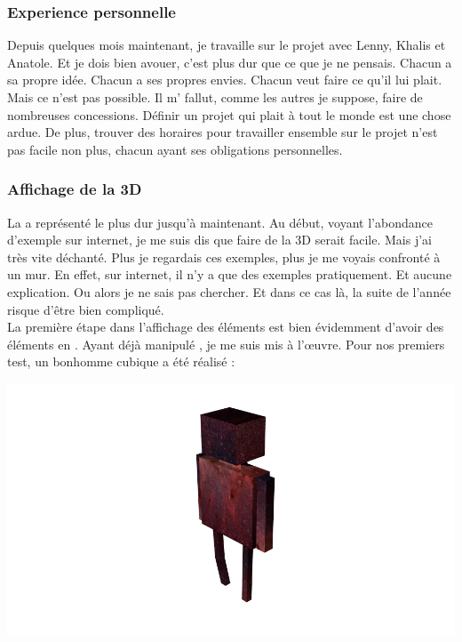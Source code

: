 \documentclass{article}
\begin{document}
\subsubsection{Experience personnelle}

Depuis quelques mois maintenant, je travaille sur le projet avec Lenny, Khalis et Anatole. Et je dois bien avouer, c'est plus dur que ce que je ne pensais. Chacun a sa propre idée. Chacun a ses propres envies. Chacun veut faire ce qu'il lui plait. Mais ce n'est pas possible. Il m' fallut, comme les autres je suppose, faire de nombreuses concessions. Définir un projet qui plait à tout le monde est une chose ardue. De plus, trouver des horaires pour travailler ensemble sur le projet n'est pas facile non plus, chacun ayant ses obligations personnelles.

\subsubsection{Affichage de la 3D}
La  a représenté le plus dur jusqu'à maintenant. Au début, voyant l'abondance d'exemple sur internet, je me suis dis que faire de la 3D serait facile. Mais j'ai très vite déchanté. Plus je regardais ces exemples, plus je me voyais confronté à un mur. En effet, sur internet, il n'y a que des exemples pratiquement. Et aucune explication. Ou alors je ne sais pas chercher. Et dans ce cas là, la suite de l'année risque d'être bien compliqué. \\
La première étape dans l'affichage des éléments  est bien évidemment d'avoir des éléments en . Ayant déjà manipulé , je me suis mis à l'\oe uvre. Pour nos premiers test, un bonhomme cubique a été réalisé : \begin{center}
\includegraphics[scale=01.0]{perso}
\end{center}
\end{document}
